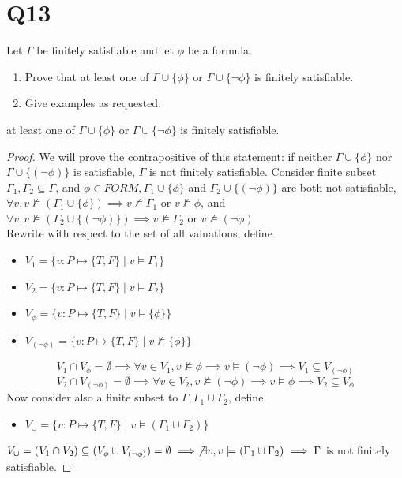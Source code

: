 \documentclass{article}
\newtheorem{lemma}[theorem]{Lemma}
\let\oldlemma\lemma
\let\endoldlemma\endlemma
\renewenvironment{lemma}
  {\begin{tcolorbox}[
      colback=green!8,
      colframe=green!50!black,
      boxrule=0.6pt,
      arc=2pt,
      left=6pt,right=6pt,top=4pt,bottom=4pt
    ]\oldlemma}
  {\endoldlemma\end{tcolorbox}}
\begin{document}
\section*{Q13}
Let $\Gamma$ be finitely satisfiable and let $\phi$ be a formula.
\begin{enumerate}
  \item Prove that at least one of $\Gamma\cup\{\phi\}$ or $\Gamma\cup\{\neg\phi\}$ is finitely satisfiable.
  \item Give examples as requested.
\end{enumerate}
\begin{lemma}\label{lem:atleastone_finsat}
    at least one of $\Gamma\cup\{\phi\}$ or $\Gamma\cup\{\neg\phi\}$ is finitely satisfiable.
\end{lemma}
\begin{proof}
    We will prove the contrapositive of this statement: if neither $\Gamma \cup \{\phi\}$ nor $\Gamma \cup \{(\neg \phi)\}$
    is satisfiable, $\Gamma$ is not finitely satisfiable.
    Consider finite subset $\Gamma_1, \Gamma_2 \subseteq \Gamma$, and $\phi \in FORM, \Gamma_1 \cup \{\phi\}$ and $\Gamma_2 \cup \{(\neg \phi)\}$
    are both not satisfiable, $\forall v, v\not \models (\Gamma_1\cup \{\phi\}) \implies v\not \models \Gamma_1$ 
    or $v \not \models \phi$, and $\forall v, v\not\models (\Gamma_2\cup \{(\neg \phi)\}) \implies v\not\models \Gamma_2$ or $v\not \models (\neg \phi)$\\
    Rewrite with respect to the set of all valuations, define 
    \begin{itemize}
        \item $V_1 = \{v: P \mapsto \{T, F\} \mid v\models \Gamma_1\}$
        \item $V_2 = \{v: P \mapsto \{T, F\} \mid v\models \Gamma_2\}$
        \item $V_\phi = \{v: P \mapsto \{T, F\} \mid v\models \{\phi\}\}$
        \item $V_{(\neg \phi)} = \{v: P \mapsto \{T, F\} \mid v\not\models \{\phi\}\}$
    \end{itemize}
    \[V_1 \cap V_\phi = \emptyset \implies \forall v \in V_1, v\not \models \phi \implies v\models (\neg \phi) \implies V_1 \subseteq V_{(\neg \phi)}\]
    \[V_2 \cap V_{(\neg \phi)} = \emptyset \implies \forall v \in V_2, v \not\models (\neg \phi) \implies v\models \phi \implies V_2 \subseteq V_{\phi}\]
    Now consider also a finite subset to $\Gamma, \Gamma_1 \cup \Gamma_2$, define 
    \begin{itemize}
        \item $V_\cup = \{v:P\mapsto \{T, F\} \mid v\models (\Gamma_1\cup \Gamma_2)\}$
    \end{itemize}
    $V_\cup = (V_1 \cap V_2) \subseteq (V_{\phi}\cup V_{(\neg \phi)}) = \emptyset\implies \not \exists v, v\models (\Gamma_1 \cup \Gamma_2) \implies \Gamma$ is not finitely satisfiable.
\end{proof}
\end{document}

